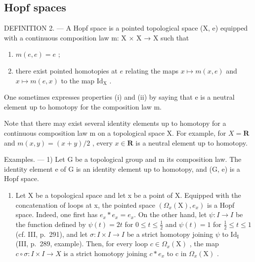 \subsection{Hopf spaces}

DEFINITION 2. --- A Hopf space is a pointed topological space (X, e) equipped with a continuous composition law m: X × X → X such that

\begin{enumerate}
\def\labelenumi{(\roman{enumi})}
\item
  \(m(e, e) = e\) ;
\item
  there exist pointed homotopies at \(e\) relating the maps \(x \mapsto m(x, e)\) and \(x \mapsto m(e, x)\) to the map \(\mathrm{Id}_{\mathrm{X}}\) .
\end{enumerate}

One sometimes expresses properties (i) and (ii) by saying that e is a neutral element up to homotopy for the composition law m.

Note that there may exist several identity elements up to homotopy for a continuous composition law m on a topological space X. For example, for \(X = \mathbf{R}\) and \(m(x, y) = (x + y)/2\) , every \(x \in \mathbf{R}\) is a neutral element up to homotopy.

Examples. --- 1) Let G be a topological group and m its composition law. The identity element e of G is an identity element up to homotopy, and (G, e) is a Hopf space.

\begin{enumerate}
\def\labelenumi{\arabic{enumi})}
\setcounter{enumi}{1}
\tightlist
\item
  Let X be a topological space and let x be a point of X. Equipped with the concatenation of loops at x, the pointed space \((\Omega_{x}(\mathrm{X}), e_{x})\) is a Hopf space. Indeed, one first has \(e_{x} * e_{x} = e_{x}\). On the other hand, let \(\psi: I \to I\) be the function defined by \(\psi(t) = 2t\) for \(0 \leqslant t \leqslant \frac{1}{2}\) and \(\psi(t) = 1\) for \(\frac{1}{2} \leqslant t \leqslant 1\) (cf. III, p.~291), and let \(\sigma: I \times I \to I\) be a strict homotopy joining \(\psi\) to \(\mathrm{Id}_{\mathrm{I}}\) (III, p.~289, example). Then, for every loop \(c \in \Omega_{x}(\mathrm{X})\) , the map \(c \circ \sigma: I \times I \to X\) is a strict homotopy joining \(c * e_{x}\) to c in \(\Omega_{x}(\mathrm{X})\) .
\end{enumerate}

